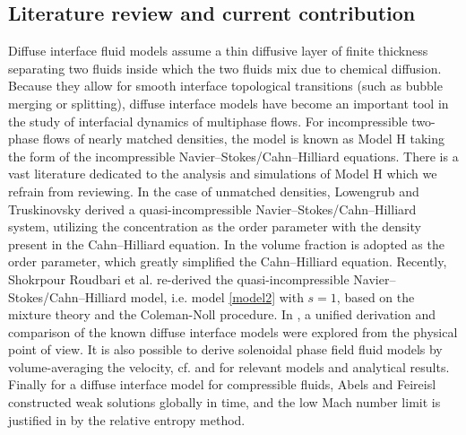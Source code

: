 \documentclass[reqno,a4paper,11pt]{amsart}
\theoremstyle{plain}
\numberwithin{equation}{section}
\begin{document}
	
	\subsection{Literature review and current contribution}
	\label{sec:literature-review}
	
	Diffuse interface fluid models assume a thin diffusive layer of finite thickness separating two fluids inside which the two fluids mix due to chemical diffusion. Because they allow for smooth interface topological transitions (such as bubble merging or splitting), diffuse interface models have become an important tool in the study of interfacial dynamics of multiphase flows.  For incompressible two-phase flows of nearly matched densities, the model is known as Model H \cite{GPV1996, HH} taking the form of the incompressible Navier--Stokes/Cahn--Hilliard equations. There is a vast literature dedicated to the analysis and simulations of Model H which we refrain from reviewing. In the case of unmatched densities, Lowengrub and Truskinovsky \cite{LT1998} derived a
	quasi-incompressible Navier--Stokes/Cahn--Hilliard system, utilizing the concentration as the order parameter with the density present in the Cahn--Hilliard equation. In \cite{SYW} the volume fraction is adopted as the order parameter, which greatly simplified the Cahn--Hilliard equation. Recently, Shokrpour Roudbari et al. \cite{SRSvBvdZ2018} re-derived the quasi-incompressible  Navier--Stokes/Cahn--Hilliard model, i.e. model \eqref{model2} with $s=1$, based on the mixture theory and the Coleman-Noll procedure. In  \cite{MKID}, a unified derivation and comparison of the known diffuse interface models were explored from the physical point of view. It is also possible to derive solenoidal phase field fluid models by volume-averaging the velocity, cf. \cite{AGG2012,AGW2025,ADGC,Boyer2002,DSS2007} and \cite{ADG,AGG2024,FS1,GMW,Giorgini2021} for relevant models and analytical results. Finally for a diffuse interface model for compressible fluids, Abels and Feireisl \cite{AF2008} constructed weak solutions globally in time, and the low Mach number limit is justified in \cite{ALN2024} by the relative entropy method. 
	
	
	
	
	
\end{document}
